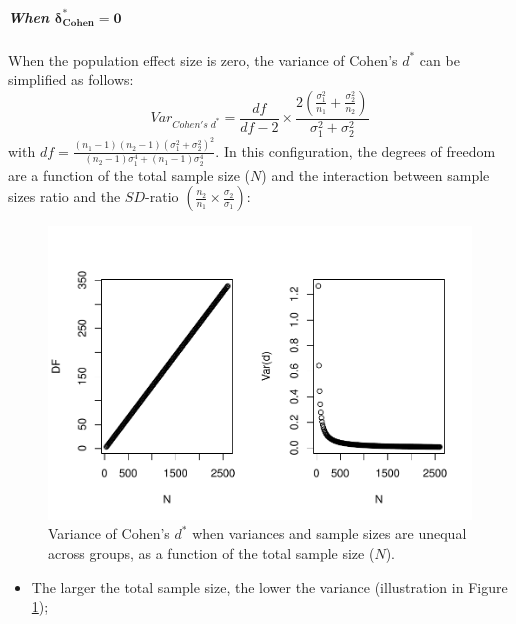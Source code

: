 \documentclass[
  english,
  man,mask]{apa6}
\providecommand{\tightlist}{%
  \setlength{\itemsep}{0pt}\setlength{\parskip}{0pt}}
\let\oldsubparagraph\subparagraph
\renewcommand{\subparagraph}[1]{\oldsubparagraph{#1}\mbox{}}
\begin{document}
\hypertarget{when-bmdelta_cohen-0-2}{%
\subparagraph{\texorpdfstring{When \(\bm{\delta^*_{Cohen} = 0}\)}{When \textbackslash bm\{\textbackslash delta\^{}*\_\{Cohen\} = 0\}}}\label{when-bmdelta_cohen-0-2}}

When the population effect size is zero, the variance of Cohen's \(d^*\) can be simplified as follows:
\[Var_{Cohen's \; d^*} = \frac{df}{df-2} \times \frac{2\left( \frac{\sigma^2_1}{n_1} + \frac{\sigma^2_2}{n_2} \right)}{\sigma^2_1+\sigma^2_2}\]
with \(df =\frac{(n_1-1)(n_2-1)(\sigma^2_1+\sigma^2_2)^2}{(n_2-1)\sigma_1^4+(n_1-1)\sigma_2^4}\). In this configuration, the degrees of freedom are a function of the total sample size (\(N\)) and the interaction between sample sizes ratio and the \(SD\)-ratio \(\left(\frac{n_2}{n_1}\times\frac{\sigma_2}{\sigma_1} \right)\):

\begin{figure}
\centering
\includegraphics{Theoretical-Bias-of-all-estimators-as-a-function-of-population-parameters_files/figure-latex/varcohendprimehetunbalNsize2-1.pdf}
\caption{\label{fig:varcohendprimehetunbalNsize2}Variance of Cohen's \(d^*\) when variances and sample sizes are unequal across groups, as a function of the total sample size (\(N\)).}
\end{figure}

\begin{itemize}
\tightlist
\item
  The larger the total sample size, the lower the variance (illustration in Figure \ref{fig:varcohendprimehetunbalNsize2});
\end{itemize}
\end{document}
